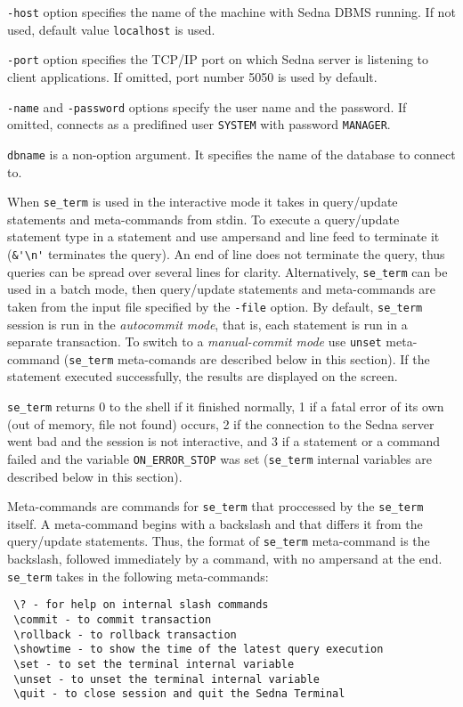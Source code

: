 \documentclass[a4paper,12pt]{article}
\begin{document}
\verb!-host! option specifies the name of the machine with Sedna DBMS running. If not used, default value \verb!localhost! is used.

\verb!-port! option specifies the TCP/IP port on which Sedna server is listening to client applications. If omitted, port number 5050 is used by default.

\verb!-name! and \verb!-password! options specify the user name and the password. If omitted, connects as a predifined user \verb!SYSTEM! with password \verb!MANAGER!.

\verb!dbname! is a non-option argument. It specifies the name of the database to connect to.

When \verb!se_term! is used in the interactive mode it takes in query/update statements and meta-commands from stdin. To execute a query/update statement type in a statement and use ampersand and line feed to terminate it (\verb!&'\n'! terminates the query). An end of line does not terminate the query, thus queries can be spread over several lines for clarity. Alternatively, \verb!se_term! can be used in a batch mode, then query/update statements and meta-commands are taken from the input file specified by the \verb!-file! option. By default, \verb!se_term! session is run in the \emph{autocommit mode}, that is, each statement is run in a separate transaction. To switch to a \emph{manual-commit mode} use \verb!unset! meta-command (\verb!se_term! meta-comands are described below in this section). If the statement executed successfully, the results are displayed on the screen.

\verb!se_term! returns 0 to the shell if it finished normally, 1 if a fatal error of its own (out of memory, file not
found) occurs, 2 if the connection to the Sedna server went bad and the session is not interactive, and 3 if
a statement or a command failed and the variable \verb!ON_ERROR_STOP! was set (\verb!se_term! internal variables are described below in this section).

Meta-commands are commands for \verb!se_term! that proccessed by the \verb!se_term! itself. A meta-command begins with a backslash and that differs it from the query/update statements. Thus, the format of \verb!se_term! meta-command is the backslash, followed immediately by a command, with no ampersand at the end. \verb!se_term! takes in the following meta-commands:

\begin{verbatim}
 \? - for help on internal slash commands
 \commit - to commit transaction
 \rollback - to rollback transaction
 \showtime - to show the time of the latest query execution
 \set - to set the terminal internal variable
 \unset - to unset the terminal internal variable
 \quit - to close session and quit the Sedna Terminal
\end{verbatim}
\end{document}
